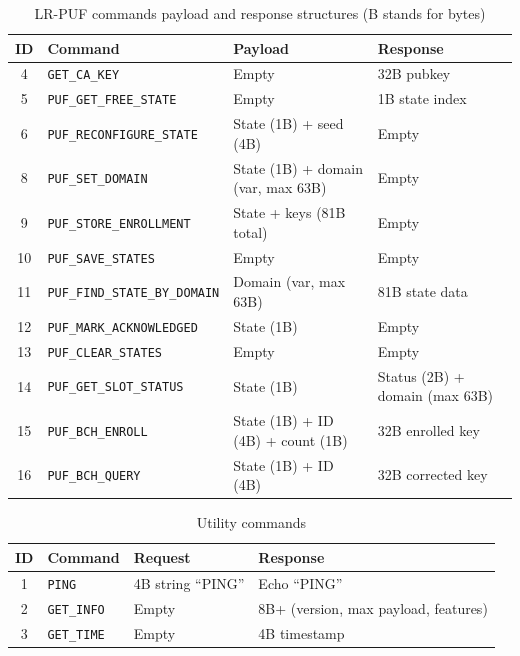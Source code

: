   \begin{table}[ht!]
  \centering
  \caption{LR-PUF commands payload and response structures (B stands for bytes)}
  \begin{tabular}{clll}
  \hline
  \textbf{ID} & \textbf{Command} & \textbf{Payload} & \textbf{Response} \\
  \hline
  4  & \texttt{GET\_CA\_KEY} & Empty & 32B pubkey \\
  5  & \texttt{PUF\_GET\_FREE\_STATE} & Empty & 1B state index \\
  6  & \texttt{PUF\_RECONFIGURE\_STATE} & State (1B) + seed (4B) & Empty \\
  8  & \texttt{PUF\_SET\_DOMAIN} & State (1B) + domain (var, max 63B) & Empty \\
  9  & \texttt{PUF\_STORE\_ENROLLMENT} & State + keys (81B total) & Empty \\
  10 & \texttt{PUF\_SAVE\_STATES} & Empty & Empty \\
  11 & \texttt{PUF\_FIND\_STATE\_BY\_DOMAIN} & Domain (var, max 63B) & 81B state data \\
  12 & \texttt{PUF\_MARK\_ACKNOWLEDGED} & State (1B) & Empty \\
  13 & \texttt{PUF\_CLEAR\_STATES} & Empty & Empty \\
  14 & \texttt{PUF\_GET\_SLOT\_STATUS} & State (1B) & Status (2B) + domain (max 63B) \\
  15 & \texttt{PUF\_BCH\_ENROLL} & State (1B) + ID (4B) + count (1B) & 32B enrolled key \\
  16 & \texttt{PUF\_BCH\_QUERY} & State (1B) + ID (4B) & 32B corrected key \\
  \hline
  \end{tabular}
  \label{tab:proto-cmds-struct}
  \end{table}


\begin{table}[ht!]
\centering
\caption{Utility commands}
\begin{tabular}{clll}
\hline
\textbf{ID} & \textbf{Command} & \textbf{Request} & \textbf{Response} \\
\hline
1 & \texttt{PING} & 4B string ``PING'' & Echo ``PING'' \\
2 & \texttt{GET\_INFO} & Empty & 8B+ (version, max payload, features) \\
3 & \texttt{GET\_TIME} & Empty & 4B timestamp \\
\hline
\end{tabular}
\label{tab:proto-util-cmds}
\end{table}

